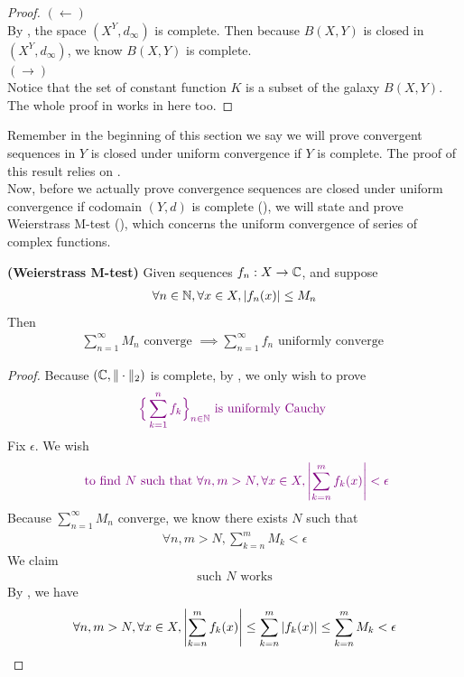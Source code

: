 \documentclass{report}
\begin{document}
\begin{proof}
$(\longleftarrow)$\\

By , the space $(X^Y, d_{\infty})$ is complete. Then because $B(X,Y)$ is closed in $(X^Y,d_\infty)$, we know $B(X,Y)$ is complete.\\

$(\longrightarrow)$\\

Notice that the set of constant function $K$ is a subset of the galaxy  $B(X,Y)$. The whole proof in  works in here too. 
\end{proof}
\begin{mdframed}
Remember in the beginning of this section we say we will prove convergent sequences in $Y$ is closed under uniform convergence if $Y$ is complete. The proof of this result relies on .\\

Now, before we actually prove convergence sequences are closed under uniform convergence if codomain $(Y,d)$ is complete (), we will state and prove Weierstrass M-test  (), which concerns the uniform convergence of series of complex functions. 
\end{mdframed}
\begin{theorem}
\label{WM-t}
\textbf{(Weierstrass M-test)} Given sequences $f_n:X\rightarrow \mathbb{C}$, and suppose 
\begin{align}
\label{K9}
\forall n\in\mathbb{N},\forall x\in X, \left|f_n(x)\right|\leq M_n
\end{align}
Then 
\begin{align*}
\sum_{n=1}^\infty M_n\text{ converge }\implies \sum_{n=1}^\infty f_n\text{ uniformly converge }
\end{align*} 
\end{theorem}
\begin{proof}
Because $(\mathbb{C},\| \cdot  \|_2)$  is complete, by , we only wish to prove 
\begin{align*}
\textcolor{violet}{ \Big\{ \sum_{k=1}^n f_k \Big\}_{n\in\mathbb{N}}\text{ is uniformly Cauchy }} 
\end{align*}
Fix $\epsilon $. We wish 
 \begin{align*}
   \textcolor{violet}{\text{ to find $N$ such that  }\forall n,m>N, \forall  x\in X, \left|\sum_{k=n}^m f_k(x)\right|< \epsilon}
\end{align*}
Because $\sum_{n=1}^\infty M_n$ converge, we know there exists $N$ such that 
\begin{align*}
\forall n,m>N, \sum_{k=n}^m M_k<\epsilon 
\end{align*}
We claim
\begin{align*}
\text{ such $N$ works }
\end{align*}
By , we have 
\begin{align*}
  \forall n,m>N, \forall x \in X, \left|\sum_{k=n}^m f_k(x)\right|\leq \sum_{k=n}^m \left|f_k(x)\right|\leq \sum_{k=n}^m M_k <\epsilon 
\end{align*}
\end{proof}
\end{document}
